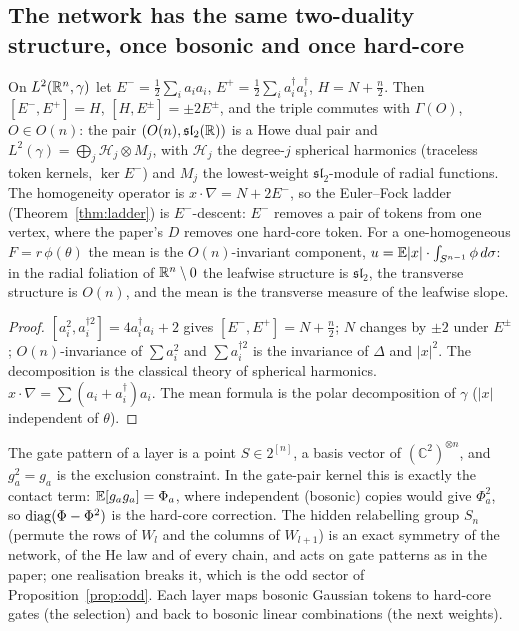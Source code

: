\subsection{The network has the same two-duality structure, once bosonic and once hard-core}
\begin{proposition}\label{prop:howe}
On $L^2(\mathbb R^n,\gamma)$ let $E^-=\tfrac12\sum_ia_ia_i$, $E^+=\tfrac12\sum_ia_i^\dagger a_i^\dagger$, $H=N+\tfrac n2$. Then $[E^-,E^+]=H$, $[H,E^\pm]=\pm2E^\pm$, and the
triple commutes with $\Gamma(O)$, $O\in O(n)$: the pair $(O(n),\mathfrak{sl}_2(\mathbb R))$ is a Howe dual pair and
$L^2(\gamma)=\bigoplus_j\mathcal H_j\otimes M_j$, with $\mathcal H_j$ the degree-$j$ spherical harmonics (traceless token kernels, $\ker E^-$) and $M_j$
the lowest-weight $\mathfrak{sl}_2$-module of radial functions. The homogeneity operator is $x\cdot\nabla=N+2E^-$, so the Euler--Fock ladder
(Theorem~\ref{thm:ladder}) is $E^-$-descent: $E^-$ removes a pair of tokens from one vertex, where the paper's $D$ removes one hard-core
token. For a one-homogeneous $F=r\,\phi(\theta)$ the mean is the $O(n)$-invariant component, $u=\mathbb E|x|\cdot\int_{S^{n-1}}\phi\,d\sigma$: in the radial
foliation of $\mathbb R^n\setminus0$ the leafwise structure is $\mathfrak{sl}_2$, the transverse structure is $O(n)$, and the mean is the transverse
measure of the leafwise slope.
\end{proposition}
\begin{proof}
$[a_i^2,a_i^{\dagger2}]=4a_i^\dagger a_i+2$ gives $[E^-,E^+]=N+\tfrac n2$; $N$ changes by $\pm2$ under $E^\pm$; $O(n)$-invariance of $\sum a_i^2$ and $\sum a_i^{\dagger2}$
is the invariance of $\Delta$ and $|x|^2$. The decomposition is the classical theory of spherical harmonics. $x\cdot\nabla=\sum(a_i+a_i^\dagger)a_i$. The mean
formula is the polar decomposition of $\gamma$ ($|x|$ independent of $\theta$).
\end{proof}

\begin{proposition}\label{prop:hardcore}
The gate pattern of a layer is a point $S\in2^{[n]}$, a basis vector of $(\mathbb C^2)^{\otimes n}$, and $g_a^2=g_a$ is the exclusion constraint. In the
gate-pair kernel this is exactly the contact term: $\mathbb E[g_ag_a]=\Phi_a$, where independent (bosonic) copies would give $\Phi_a^2$, so
$\operatorname{diag}(\Phi-\Phi^2)$ is the hard-core correction. The hidden relabelling group $S_n$ (permute the rows of $W_l$ and the columns of $W_{l+1}$) is an
exact symmetry of the network, of the He law and of every chain, and acts on gate patterns as in the paper; one realisation breaks it,
which is the odd sector of Proposition~\ref{prop:odd}. Each layer maps bosonic Gaussian tokens to hard-core gates (the selection) and
back to bosonic linear combinations (the next weights).
\end{proposition}

